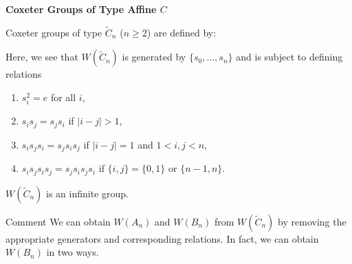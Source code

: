 \documentclass{beamer}
\newcommand{\C}{\widetilde{C}}
\begin{document}
\begin{frame}{\textbf{Coxeter Groups of Type Affine $C$}}

Coxeter groups of type $\C_{n}$ ($n \geq 2$) are defined by:
\begin{figure}
\end{figure}

\pause 
Here, we see that $W(\C_{n})$ is generated by $\{s_{0}, 
\ldots, s_{n}\}$ and is subject to defining relations
\begin{enumerate}
\item $s_{i}^{2}=e$ for all $i$,
\item $s_{i}s_{j}=s_{j}s_{i}$ if $|i-j|>1$,
\item $s_{i}s_{j}s_{i}=s_{j}s_{i}s_{j}$ if $|i-j|=1$ and $1< i,j < n$, 
\item $s_{i}s_{j}s_{i}s_{j}=s_{j}s_{i}s_{j}s_{i}$ if $\{i,j\}=\{0,1\}$ or 
$\{n-1,n\}$.
\end{enumerate}
\pause 

$W(\C_{n})$ is an infinite group.

\pause

\begin{block}{Comment}
We can obtain $W(A_{n})$ and $W(B_{n})$ from $W(\C_{n})$ by removing the 
appropriate generators and corresponding relations.  In fact, 
we can obtain $W(B_{n})$ in two ways.
\end{block}

\end{frame}

\end{document}
